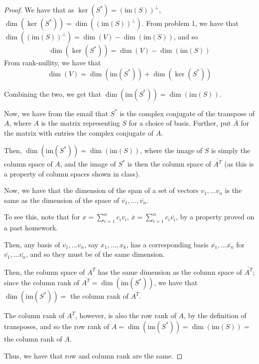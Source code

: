 \documentclass[12pt,letterpaper]{article}
\theoremstyle{definition}
\newcommand{\im}{\mathrm{im}}
\begin{document}
\begin{proof}
  We have that as $\ker(S^*) = (\im(S))^\perp$, $\dim(\ker(S^*)) =
  \dim((\im(S))^\perp)$. From problem 1, we have that $\dim((\im(S))^\perp) =
  \dim(V) - \dim(\im(S))$, and so \[
    \dim(\ker(S^*)) = \dim(V) - \dim(\im(S))
  \]  From rank-nullity, we have that \[
    \dim(V) = \dim(\im(S^*)) + \dim(\ker(S^*))
  \]

  Combining the two, we get that $\dim(\im(S^*)) = \dim(\im(S))$.

  Now, we have from the email that $S^*$ is the complex conjugate of the
  transpose of $A$, where $A$ is the matrix representing $S$ for a choice of
  basis. Further, put $\overline{A}$ for the matrix with entries the complex
  conjugate of $A$.

  Then, $\dim(\im(S^*)) = \dim(\im(S))$, where the image of $S$ is simply the
  column space of $A$, and the image of $S^*$ is then the column space of
  $\overline{A^T}$ (as this is a property of column spaces shown in class).

  Now, we have that the dimension of the span of a set of vectors $v_1, \dots
  v_n$ is the same as the dimension of the space of $\overline{v_1}, \dots,
  \overline{v_n}$.

  To see this, note that for $x = \sum_{i=1}^nc_iv_i$, $\overline{x} =
  \sum_{i=1}^nc_i\overline{v_i}$, by a property proved on a past homework.

  Then, any basis of $v_1, \dots
  v_n$, say $x_1, \dots, x_k$, has a corresponding basis $\overline{x_1}, \dots
  \overline{x_n}$ for $\overline{v_1}, \dots
  \overline{v_n}$, and so they must be of the same dimension.

  Then, the column space of $A^T$ has the same dimension as the column space of
  $\overline{A^T}$; since the column rank of $\overline{A^T} = \dim(\im(S^*))$,
  we have that $\dim(\im(S^*)) = $ the column rank of $A^T$.

  The column rank of $A^T$, however, is also the row rank of $A$, by the
  definition of transposes, and
  so the row rank of $A = \dim(\im(S^*)) = \dim(\im(S)) = $ the column rank of
  $A$.

  Thus, we have that row and column rank are the same.
\end{proof}
\end{document}
